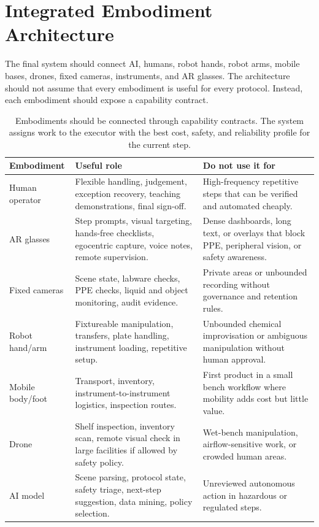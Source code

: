 \documentclass[11pt]{article}
\begin{document}
\section{Integrated Embodiment Architecture}

The final system should connect AI, humans, robot hands, robot arms, mobile bases, drones, fixed cameras, instruments, and AR glasses. The architecture should not assume that every embodiment is useful for every protocol. Instead, each embodiment should expose a capability contract.

\begin{table}[htbp]
\centering
\small
\begin{tabularx}{\linewidth}{@{}L{2.4cm}Y Y@{}}
\toprule
\textbf{Embodiment} & \textbf{Useful role} & \textbf{Do not use it for} \\
\midrule
Human operator & Flexible handling, judgement, exception recovery, teaching demonstrations, final sign-off. & High-frequency repetitive steps that can be verified and automated cheaply. \\
AR glasses & Step prompts, visual targeting, hands-free checklists, egocentric capture, voice notes, remote supervision. & Dense dashboards, long text, or overlays that block PPE, peripheral vision, or safety awareness. \\
Fixed cameras & Scene state, labware checks, PPE checks, liquid and object monitoring, audit evidence. & Private areas or unbounded recording without governance and retention rules. \\
Robot hand/arm & Fixtureable manipulation, transfers, plate handling, instrument loading, repetitive setup. & Unbounded chemical improvisation or ambiguous manipulation without human approval. \\
Mobile body/foot & Transport, inventory, instrument-to-instrument logistics, inspection routes. & First product in a small bench workflow where mobility adds cost but little value. \\
Drone & Shelf inspection, inventory scan, remote visual check in large facilities if allowed by safety policy. & Wet-bench manipulation, airflow-sensitive work, or crowded human areas. \\
AI model & Scene parsing, protocol state, safety triage, next-step suggestion, data mining, policy selection. & Unreviewed autonomous action in hazardous or regulated steps. \\
\bottomrule
\end{tabularx}
\caption{Embodiments should be connected through capability contracts. The system assigns work to the executor with the best cost, safety, and reliability profile for the current step.}
\label{tab:embodiments}
\end{table}
\end{document}

